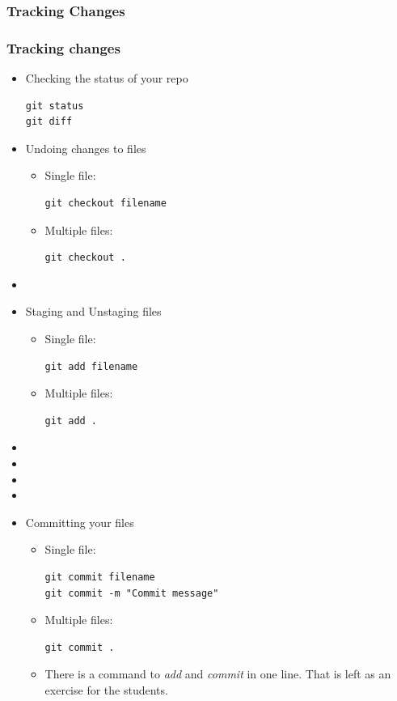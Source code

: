 \documentclass[10pt,t,sans,mathsans,xcolor=dvipsnames]{beamer}
\begin{document}
\subsubsection*{Tracking Changes}
\begin{frame}
\frametitle{Tracking changes}
\begin{itemize}
\item Checking the status of your repo
\begin{lstlisting}
git status
git diff
\end{lstlisting}
\item Undoing changes to files
\begin{itemize}
\item Single file:
\begin{lstlisting}
git checkout filename
\end{lstlisting}
\item Multiple files:
\begin{lstlisting}
git checkout .
\end{lstlisting}
\end{itemize}
\item[]
\item Staging and Unstaging files
\begin{itemize}
\item Single file:
\begin{lstlisting}
git add filename
\end{lstlisting}
\item Multiple files:
\begin{lstlisting}
git add .
\end{lstlisting}
\end{itemize}
\item[]
\item[]
\item[]
\item[]
\item Committing your files
\begin{itemize}
\item Single file:
\begin{lstlisting}
git commit filename
git commit -m "Commit message"
\end{lstlisting}
\item Multiple files:
\begin{lstlisting}
git commit .
\end{lstlisting}
\item There is a command to \textit{add} and \textit{commit} in one line. That is left as an exercise for the students.

\end{itemize}
\end{itemize}
\end{frame}
\end{document}

